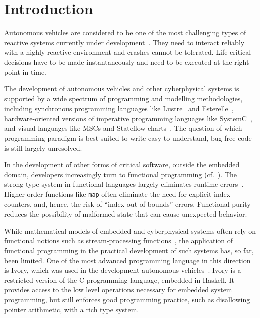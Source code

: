 \section{Introduction}

Autonomous vehicles are considered to be one of the most challenging
types of reactive systems currently under development~\cite{AlurMT16,
  WongpiromsarnKF11, RamanDSMS15}. They need to interact reliably with
a highly reactive environment and crashes cannot be tolerated.  Life
critical decisions have to be made instantaneously and need to be
executed at the right point in time.

The development of autonomous vehicles and other cyberphysical systems
is supported by a wide spectrum of
programming and modelling methodologies, 
including synchronous programming languages like Lustre~\cite{conf/popl/CaspiPHP87} 
and Esterelle~\cite{conf/concur/BerryC84},
hardware-oriented versions of imperative programming languages like
SystemC~\cite{open2006ieee}, and visual languages like MSCs and Stateflow-charts~\cite{harel2003message,journals/scp/Harel87}.
The question of which programming paradigm is best-suited to write
easy-to-understand, bug-free code is still largely unresolved.

In the development of other forms of critical software, outside the
embedded domain, developers increasingly turn to functional
programming (cf.~\cite{frankau2009commercial}).  The strong type system in functional
languages largely eliminates runtime errors~\cite{cardelli1996type}.
Higher-order functions like \texttt{map} often eliminate the need for
explicit index counters, and, hence, the risk of ``index out of
bounds'' errors.  Functional purity reduces the possibility of
malformed state that can cause unexpected behavior.

While mathematical models of embedded and cyberphysical systems often
rely on functional notions such as stream-processing
functions~\cite{DBLP:series/mcs/BroyS01,DBLP:conf/csdm/Broy12}, the
application of functional programming in the practical development of
such systems has, so far, been limited. One of the most advanced
programming language in this direction is Ivory, which was used in the
development autonomous vehicles~\cite{pike2014}.  Ivory is a
restricted version of the C programming language, embedded in Haskell.
It provides access to the low level operations necessary for embedded
system programming, but still enforces good programming practice, such
as disallowing pointer arithmetic, with a rich type system.

